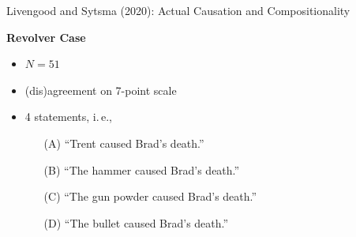 \documentclass[xcolor=table,9pt,aspectratio=169]{beamer}
\begin{document}
\begin{frame}{\vspace*{10mm}Livengood and Sytsma (2020): Actual Causation and Compositionality}
\vspace*{-5mm}
\begin{multicols}{2}
\textbf{Revolver Case}
\begin{itemize}
   \item $N=51$
   \item (dis)agreement on 7-point scale
   \item 4 statements, i.\,e.,
   \begin{itemize}
      \item[(A)] ``Trent caused Brad's death.''
      \item[(B)] ``The hammer caused Brad's death.''
      \item[(C)] ``The gun powder caused Brad's death.''
      \item[(D)] ``The bullet caused Brad's death.''
   \end{itemize}
\end{itemize}
\vfill
\begin{center}
\end{center}
\end{multicols}
\end{frame}
\end{document}
